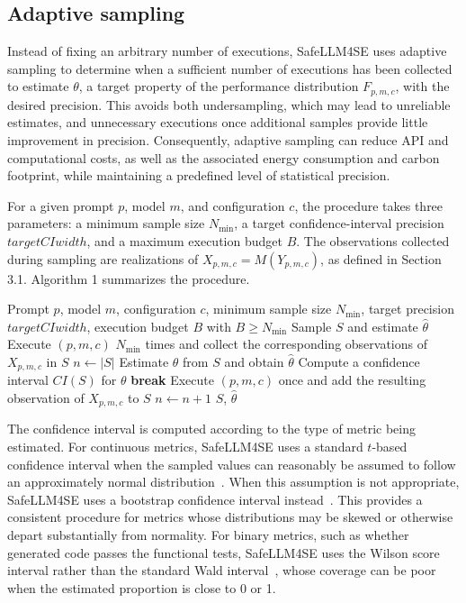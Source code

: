 \documentclass{IEEEcsmag}
\begin{document}
\subsection{Adaptive sampling}
\label{subsection:SafeLLM4SE:adaptive-sampling}

Instead of fixing an arbitrary number of executions, SafeLLM4SE uses adaptive sampling to determine when a sufficient number of executions has been collected to estimate $\theta$, a target property of the performance distribution $F_{p,m,c}$, with the desired precision. This avoids both undersampling, which may lead to unreliable estimates, and unnecessary executions once additional samples provide little improvement in precision. Consequently, adaptive sampling can reduce API and computational costs, as well as the associated energy consumption and carbon footprint, while maintaining a predefined level of statistical precision.

For a given prompt $p$, model $m$, and configuration $c$, the procedure takes three parameters: a minimum sample size $N_{\min}$, a target confidence-interval precision $targetCIwidth$, and a maximum execution budget $B$. The observations collected during sampling are realizations of $X_{p,m,c}=M(Y_{p,m,c})$, as defined in Section 3.1. Algorithm 1 summarizes the procedure.


\begin{algorithm} 
	\caption{Adaptive sampling} 
	\label{alg:adaptive-sampling} 
	\begin{algorithmic}[1] 
		
		\REQUIRE Prompt $p$, model $m$, configuration $c$, minimum sample size $N_{\min}$, target precision $targetCIwidth$, execution budget $B$ with $B \geq N_{\min}$ 		
		\ENSURE Sample $S$ and estimate $\hat{\theta}$ 		
		\STATE Execute $(p,m,c)$ $N_{\min}$ times and collect the corresponding observations of $X_{p,m,c}$ in $S$ 		
		\STATE $n \gets |S|$ 		
			\STATE Estimate $\theta$ from $S$ and obtain $\hat{\theta}$ 		
			\STATE Compute a confidence interval $CI(S)$ for $\theta$ 		
				\STATE \textbf{break} 
			\ENDIF 		
			\STATE Execute $(p,m,c)$ once and add the resulting observation of $X_{p,m,c}$ to $S$ 		
			\STATE $n \gets n + 1$ 		
		\ENDWHILE 		
		\RETURN $S$, $\hat{\theta}$ 
	\end{algorithmic} 
\end{algorithm}


The confidence interval is computed according to the type of metric being estimated. For continuous metrics, SafeLLM4SE uses a standard $t$-based confidence interval when the sampled values can reasonably be assumed to follow an approximately normal distribution~\cite{Efron1993}. When this assumption is not appropriate, SafeLLM4SE uses a bootstrap confidence interval instead~\cite{Efron1993}. This provides a consistent procedure for metrics whose distributions may be skewed or otherwise depart substantially from normality. For binary metrics, such as whether generated code passes the functional tests, SafeLLM4SE uses the Wilson score interval rather than the standard Wald interval~\cite{Wilson1927}, whose coverage can be poor when the estimated proportion is close to 0 or 1.
\end{document}
